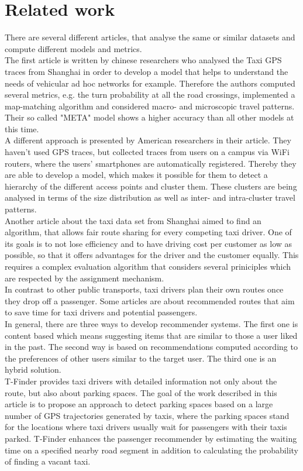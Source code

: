 \documentclass[11pt,conference,a4paper,twocolumns,romanappendices]{IEEEtran}
\begin{document}
\section{Related work}
There are several different articles, that analyse the same or similar datasets and compute different models and metrics. \\
The first article is written by chinese researchers who analysed the Taxi GPS traces from Shanghai in order to develop a model that helps to understand the needs of vehicular ad hoc networks for example. Therefore the authors computed several metrics, e.g. the turn probability at all the road crossings, implemented a map-matching algorithm and considered macro- and microscopic travel patterns. Their so called "META" model shows a higher accuracy than all other models at this time. \cite{meta} \\
A different approach is presented by American researchers in their article. They haven't used GPS traces, but collected traces from users on a campus via WiFi routers, where the users' smartphones are automatically registered. Thereby they are able to develop a model, which makes it possible for them to detect a hierarchy of the different access points and cluster them. These clusters are being analysed in terms of the size distribution as well as inter- and intra-cluster travel patterns. \cite{wlan} \\
Another article about the taxi data set from Shanghai aimed to find an algorithm, that allows fair route sharing for every competing taxi driver. One of its goals is to not lose efficiency and to have driving cost per customer as low as possible, so that it offers advantages for the driver and the customer equally. This requires a complex evaluation algorithm that considers several priniciples which are respected by the assignment mechanism. \cite{scram} \\
In contrast to other public transports, taxi drivers plan their own routes once they drop off a passenger. Some articles are about recommended routes that aim to save time for taxi drivers and potential passengers. \\
In general, there are three ways to develop recommender systems. The first one is content based which means suggesting items that are similar to those a user liked in the past. The second way is based on recommendations computed according to the preferences of other users similar to the target user. The third one is an hybrid solution. \\
T-Finder provides taxi drivers with detailed information not only about the route, but also about parking spaces. \cite{tf} The goal of the work described in this article is to propose an approach to detect parking spaces based on a large number of GPS trajectories generated by taxis, where the parking spaces stand for the locations where taxi drivers usually wait for passengers with their taxis parked. T-Finder enhances the passenger recommender by estimating the waiting time on a specified nearby road segment in addition to calculating the probability of finding a vacant taxi. \\
\end{document}
